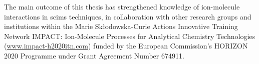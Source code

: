 The main outcome of this thesis has strengthened knowledge of ion-molecule interactions in \acrshort{scims} techniques, in collaboration with other research groups and institutions within the Marie Sk\l{}odowska-Curie Actions Innovative Training Network IMPACT: Ion-Molecule Processes for Analytical Chemistry Technologies (\href{www.impact-h2020itn.com}{www.impact-h2020itn.com}) funded by the European Commission’s HORIZON 2020 Programme under Grant Agreement Number 674911.














